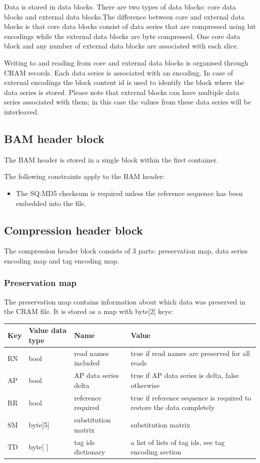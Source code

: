 \documentclass[a4paper]{article}
\begin{document}
Data is stored in data blocks. There are two types of data blocks: core data blocks 
and external data blocks.The difference between core and external data blocks is 
that core data blocks consist of data series that are compressed using bit encodings 
while the external data blocks are byte compressed. One core data block and any 
number of external data blocks are associated with each slice.

Writing to and reading from core and external data blocks is organised through 
CRAM records. Each data series is associated with an encoding. In case of external 
encodings the block content id is used to identify the block where the data series 
is stored. Please note that external blocks can have multiple data series associated 
with them; in this case the values from these data series will be interleaved. 


\subsection{\textbf{BAM header block}}

The BAM header is stored in a single block within the first container. 

The following constraints apply to the BAM header: 

\begin{itemize}
\item The SQ:MD5 checksum is required unless the reference sequence has been embedded 
into the file.
\end{itemize}

\subsection{\textbf{Compression header block}}
\label{subsec:compression-header}

The compression header block consists of 3 parts: preservation map, data series 
encoding map and tag encoding map.

\subsubsection*{Preservation map}

The preservation map contains information about which data was preserved in the 
CRAM file. It is stored as a map with byte[2] keys:

\begin{tabular}{|l|l|>{\raggedright}p{100pt}|>{\raggedright}p{220pt}|}
\hline
\textbf{Key} & \textbf{Value data type} & \textbf{Name} & \textbf{Value}\tabularnewline
\hline
RN & bool & read names included & true if read names are preserved for all reads\tabularnewline
\hline
AP & bool & AP data series delta & true if AP data series is delta, false otherwise\tabularnewline
\hline
RR & bool & reference required & true if reference sequence is required to restore 
the data completely\tabularnewline
\hline
SM & byte[5] & substitution matrix & substitution matrix\tabularnewline
\hline
TD & byte[ ] & tag ids dictionary & a list of lists of tag ids, see tag encoding 
section\tabularnewline
\hline
\end{tabular}
\end{document}
